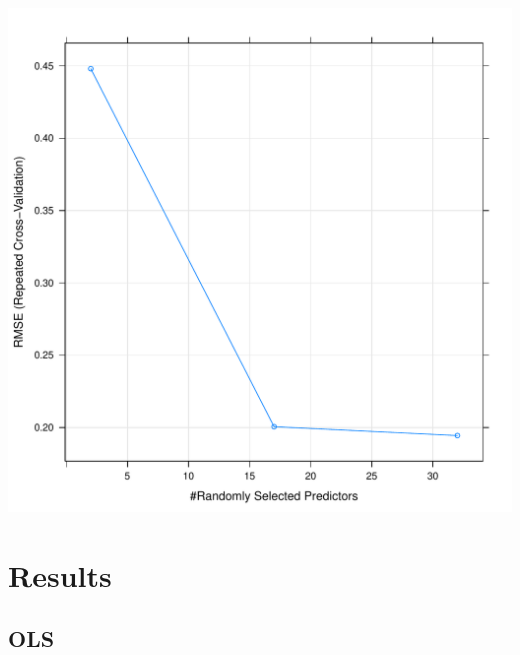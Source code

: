 \documentclass{article}
\begin{document}
\includegraphics{randomforest.pdf}

\section{Results}

\subsection{OLS}
\end{document}
